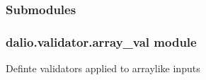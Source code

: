 \documentclass[letterpaper,10pt,english]{sphinxmanual}
\begin{document}
\subsubsection{Submodules}
\label{\detokenize{dalio.validator:submodules}}

\subsubsection{dalio.validator.array\_val module}
\label{\detokenize{dalio.validator:module-dalio.validator.array_val}}\label{\detokenize{dalio.validator:dalio-validator-array-val-module}}
Definte validators applied to array\sphinxhyphen{}like inputs
\end{document}
